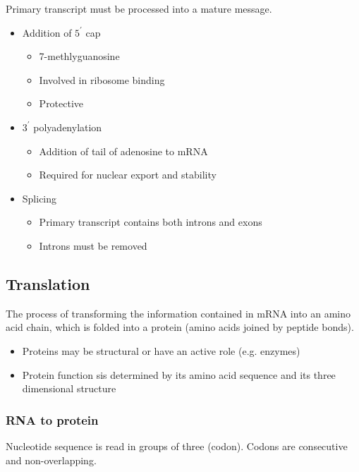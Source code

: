 \documentclass[a4paper]{article}
\begin{document}
Primary transcript must be processed into a mature message.

\begin{itemize}
  \item Addition of $5^{\prime}$ cap
    \begin{itemize}
      \item 7-methlyguanosine
      \item Involved in ribosome binding
      \item Protective
    \end{itemize}
  \item $3^{\prime}$ polyadenylation
    \begin{itemize}
      \item Addition of tail of adenosine to mRNA
      \item Required for nuclear export and stability
    \end{itemize}
  \item Splicing
    \begin{itemize}
      \item Primary transcript contains both introns and exons
      \item Introns must be removed
    \end{itemize}
\end{itemize}

\subsection{Translation}

The process of transforming the information contained in mRNA into an amino acid
chain, which is folded into a protein (amino acids joined by peptide bonds).

\begin{itemize}
  \item Proteins may be structural or have an active role (e.g. enzymes)
  \item Protein function sis determined by its amino acid sequence and its three
        dimensional structure
\end{itemize}

\subsubsection{RNA to protein}

Nucleotide sequence is read in groups of three (codon). Codons are consecutive
and non-overlapping.
\end{document}
